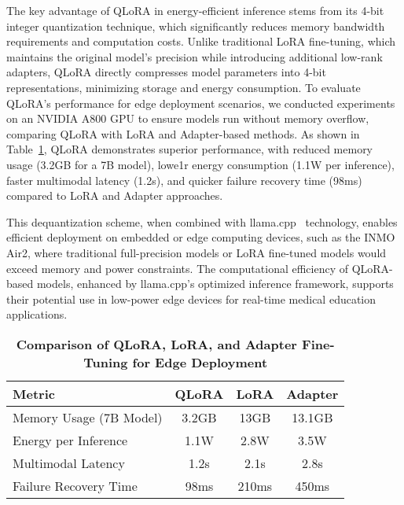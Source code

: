 \documentclass[10pt,letterpaper]{article}
\begin{document}
The key advantage of QLoRA in energy-efficient inference stems from its 4-bit integer quantization technique, which significantly reduces memory bandwidth requirements and computation costs. Unlike traditional LoRA fine-tuning, which maintains the original model’s precision while introducing additional low-rank adapters, QLoRA directly compresses model parameters into 4-bit representations, minimizing storage and energy consumption. To evaluate QLoRA’s performance for edge deployment scenarios, we conducted experiments on an NVIDIA A800 GPU to ensure models run without memory overflow, comparing QLoRA with LoRA and Adapter-based methods. As shown in Table~\ref{tab:edge-chars}, QLoRA demonstrates superior performance, with reduced memory usage (3.2GB for a 7B model), lowe1r energy consumption (1.1W per inference), faster multimodal latency (1.2s), and quicker failure recovery time (98ms) compared to LoRA and Adapter approaches.

This dequantization scheme, when combined with llama.cpp~\cite{ggerganov2023llamacpp} technology, enables efficient deployment on embedded or edge computing devices, such as the INMO Air2, where traditional full-precision models or LoRA fine-tuned models would exceed memory and power constraints. The computational efficiency of QLoRA-based models, enhanced by llama.cpp’s optimized inference framework, supports their potential use in low-power edge devices for real-time medical education applications.



\begin{table}[ht]
\centering
\caption{\bf Comparison of QLoRA, LoRA, and Adapter Fine-Tuning for Edge Deployment}
\begin{tabular}{l|c|c|c}
\hline
\textbf{Metric} & \textbf{QLoRA} & \textbf{LoRA} & \textbf{Adapter} \\ \hline
Memory Usage (7B Model) & 3.2GB & 13GB & 13.1GB \\ \hline
Energy per Inference & 1.1W & 2.8W & 3.5W \\ \hline
Multimodal Latency & 1.2s & 2.1s & 2.8s \\ \hline
Failure Recovery Time & 98ms & 210ms & 450ms \\ \hline
\end{tabular}
\label{tab:edge-chars}
\end{table}
\end{document}
